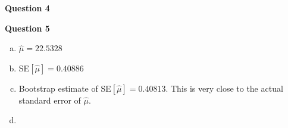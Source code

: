 \documentclass[12pt, letterpaper]{article}
\begin{document}
\noindent \textbf{Question 4} 

\noindent \textbf{Question 5} 
\begin{enumerate}[a.]
    \item $\hat \mu = 22.5328$
    \item SE$[\hat \mu] = 0.40886$
    \item Bootstrap estimate of SE$[\hat \mu] = 0.40813$. This is very 
        close to the actual standard error of $\hat \mu$.
    \item 
\end{enumerate}
\end{document}

